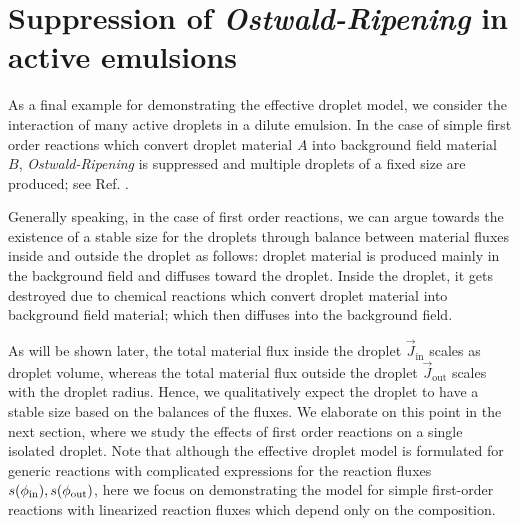 \section{Suppression of \textit{Ostwald-Ripening} in active emulsions}

As a final example for demonstrating the effective droplet model, we consider the interaction of many active droplets in a dilute emulsion.
In the case of simple first order reactions which convert droplet material $A$ into background field material $B$, \textit{Ostwald-Ripening} is suppressed and multiple droplets of a fixed size are produced; see Ref. \cite{Zwicker2015}.


Generally speaking, in the case of first order reactions, we can argue towards the existence of a stable size for the droplets through balance between material fluxes inside and outside the droplet as follows:
droplet material is produced mainly in the background field and diffuses toward the droplet.
Inside the droplet, it gets destroyed due to chemical reactions which convert droplet material into background field material; which then diffuses into the background field.

As will be shown later, the total material flux inside the droplet $\vec{J}_\mathrm{in}$ scales as droplet volume, whereas the total material flux outside the droplet $\vec{J}_\mathrm{out}$ scales with the droplet radius.
Hence, we qualitatively expect the droplet to have a stable size based on the balances of the fluxes.
We elaborate on this point in the next section, where we study the effects of first order reactions on a single isolated droplet. 
Note that although the effective droplet model is formulated for generic reactions with complicated expressions for the reaction fluxes $s(\phi_\mathrm{in}), s(\phi_\mathrm{out})$, here we focus on demonstrating the model for simple first-order reactions with linearized reaction fluxes which depend only on the composition.

